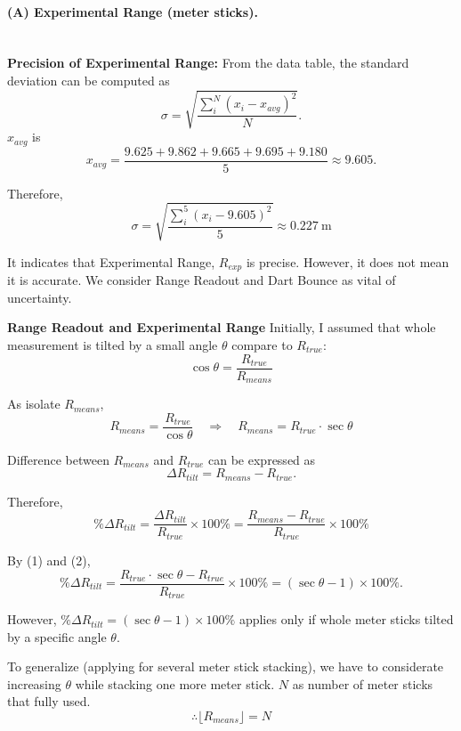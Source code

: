 \documentclass[12pt]{article}
\begin{document}
\paragraph{(A) Experimental Range (meter sticks).}

\leavevmode \\[0.5em]

\textbf{Precision of Experimental Range:} 
From the data table, the standard deviation can be computed as
\[
\sigma=
\sqrt{\frac{\sum_{i}^{N}(x_i-x_{avg})^2}{N}}.
\]
$x_{avg}$ is
\[
x_{avg}=\frac{9.625+9.862+9.665+9.695+9.180}{5}\approx9.605.
\]
\vspace{1em}

Therefore,
\[
\sigma = 
\sqrt{\frac{\sum_{i}^{5}(x_i-9.605)^2}{5}}
\approx\boxed{0.227~\mathrm{m}}
\]

\vspace{1em}

It indicates that Experimental Range, $R_{exp}$ is precise. However, it does not mean it is accurate. We consider Range Readout and Dart Bounce as vital of uncertainty.
\vspace{1em}

\textbf{Range Readout and Experimental Range}
Initially, I assumed that whole measurement is tilted by a small angle $\theta$ compare to $R_{true}$:
\[
\cos\theta=\frac{R_{true}}{R_{means}}
\]

As isolate $R_{means}$,
\[
R_{means}=\frac{R_{true}}{\cos\theta}
\quad\Rightarrow\quad
R_{means}=R_{true}\cdot\sec\theta
\tag{1}
\]

\vspace{1em}

Difference between $R_{means}$ and $R_{true}$ can be expressed as
\[
\Delta R_{tilt} = R_{means} - R_{true}.
\]

Therefore,
\[
\%\Delta R_{tilt} = \frac{\Delta R_{tilt}} {R_{true}}\times 100\%=\frac{R_{means} - R_{true}}{R_{true}}\times 100\%
\tag{2}
\]

By (1) and (2),
\[
\%\Delta R_{tilt} = \frac{R_{true}\cdot\sec\theta - R_{true}}{R_{true}} \times 100\%= (\sec \theta - 1)\times 100\%.
\]

\vspace{1em}

However, $\%\Delta R_{tilt} = (\sec \theta - 1)\times 100\%$ applies only if whole meter sticks tilted by a specific angle $\theta$.

To generalize (applying for several meter stick stacking), we have to considerate increasing $\theta$ while stacking one more meter stick.
$N$ as number of meter sticks that fully used.
\[
\therefore \lfloor R_{means}\rfloor=N
\]
\end{document}
